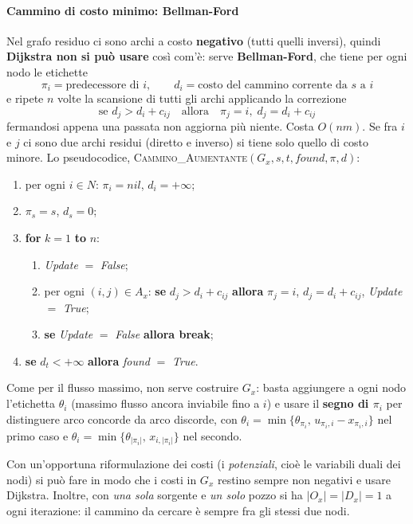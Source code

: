 \documentclass[12pt]{extarticle} %
\begin{document}
\paragraph{Cammino di costo minimo: Bellman-Ford}
Nel grafo residuo ci sono archi a costo \textbf{negativo} (tutti quelli inversi), quindi \textbf{Dijkstra non si può usare} così com'è: serve \textbf{Bellman-Ford}, che tiene per ogni nodo le etichette
\[
\pi_i = \text{predecessore di } i, \qquad d_i = \text{costo del cammino corrente da } s \text{ a } i
\]
e ripete $n$ volte la scansione di tutti gli archi applicando la correzione
\[
\text{se } d_j > d_i + c_{ij} \quad\text{allora}\quad \pi_j = i,\; d_j = d_i + c_{ij}
\]
fermandosi appena una passata non aggiorna più niente. Costa $O(nm)$. Se fra $i$ e $j$ ci sono due archi residui (diretto e inverso) si tiene solo quello di costo minore.
\noindent Lo pseudocodice, \textsc{Cammino\_Aumentante}$(G_x,s,t,\textit{found},\pi,d)$:
\begin{enumerate}
    \item per ogni $i \in N$: $\pi_i = \textit{nil}$, $d_i = +\infty$;
    \item $\pi_s = s$, $d_s = 0$;
    \item \textbf{for} $k = 1$ \textbf{to} $n$:
    \begin{enumerate}
        \item \textit{Update} $=$ \textit{False};
        \item per ogni $(i,j) \in A_x$: \textbf{se} $d_j > d_i + c_{ij}$ \textbf{allora} $\pi_j = i$, $d_j = d_i + c_{ij}$, \textit{Update} $=$ \textit{True};
        \item \textbf{se} \textit{Update} $=$ \textit{False} \textbf{allora break};
    \end{enumerate}
    \item \textbf{se} $d_t < +\infty$ \textbf{allora} \textit{found} $=$ \textit{True}.
\end{enumerate}
\noindent Come per il flusso massimo, non serve costruire $G_x$: basta aggiungere a ogni nodo l'etichetta $\theta_i$ (massimo flusso ancora inviabile fino a $i$) e usare il \textbf{segno di $\pi_i$} per distinguere arco concorde da arco discorde, con $\theta_i = \min\{\theta_{\pi_i},\, u_{\pi_i,i}-x_{\pi_i,i}\}$ nel primo caso e $\theta_i = \min\{\theta_{|\pi_i|},\, x_{i,|\pi_i|}\}$ nel secondo.

\begin{tcolorbox}[colback=blue!4, colframe=blue!50!black, title=\textbf{Dettaglio che vale un punto}]
Con un'opportuna riformulazione dei costi (i \emph{potenziali}, cioè le variabili duali dei nodi) si può fare in modo che i costi in $G_x$ restino sempre non negativi e usare Dijkstra. Inoltre, con \emph{una sola} sorgente e \emph{un solo} pozzo si ha $|O_x| = |D_x| = 1$ a ogni iterazione: il cammino da cercare è sempre fra gli stessi due nodi.
\end{tcolorbox}
\end{document}
